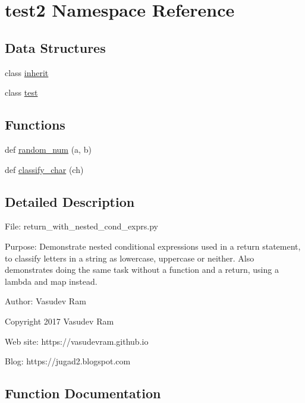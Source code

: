 \hypertarget{namespacetest2}{}\section{test2 Namespace Reference}
\label{namespacetest2}
\subsection*{Data Structures}
\begin{DoxyCompactItemize}
\item 
class \mbox{\hyperlink{classtest2_1_1inherit}{inherit}}
\item 
class \mbox{\hyperlink{classtest2_1_1test}{test}}
\end{DoxyCompactItemize}
\subsection*{Functions}
\begin{DoxyCompactItemize}
\item 
def \mbox{\hyperlink{namespacetest2_ad51b0e35b3469d6956fcc46f2fac7399}{random\+\_\+num}} (a, b)
\item 
def \mbox{\hyperlink{namespacetest2_a1fb661490eb37c305e773bbc5305a5a5}{classify\+\_\+char}} (ch)
\end{DoxyCompactItemize}


\subsection{Detailed Description}
\begin{DoxyVerb}File: return_with_nested_cond_exprs.py 

Purpose: Demonstrate nested conditional expressions used in a return statement, 
to classify letters in a string as lowercase, uppercase or neither.
Also demonstrates doing the same task without a function and a return, 
using a lambda and map instead.

Author: Vasudev Ram

Copyright 2017 Vasudev Ram

Web site: https://vasudevram.github.io

Blog: https://jugad2.blogspot.com
\end{DoxyVerb}
 

\subsection{Function Documentation}
\mbox{\label{namespacetest2_a1fb661490eb37c305e773bbc5305a5a5}} 
